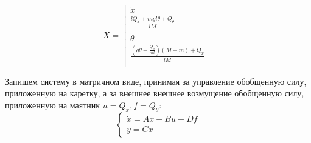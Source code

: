 \begin{equation}
    \dot{X} = \begin{bmatrix}
        \dot{x} \\
        \frac{lQ_x + mgl\theta + Q_{\theta} }{lM} \\ 
        \dot{\theta} \\
        \frac{(g\theta + \frac{Q_{\theta}}{ml})(M + m) + Q_x}{lM} \\ 
    \end{bmatrix}
\end{equation}

Запишем систему в матричном виде, принимая за управление обобщенную силу, приложенную на каретку, а за внешнее 
внешнее возмущение обобщенную силу, приложенную на маятник $u = Q_x, f = Q_{\theta}$:
\begin{equation}
    \begin{cases}
        \dot{x} = Ax + Bu + Df \\ 
        y = Cx
    \end{cases}
    \label{eq:linear_model}
\end{equation}
